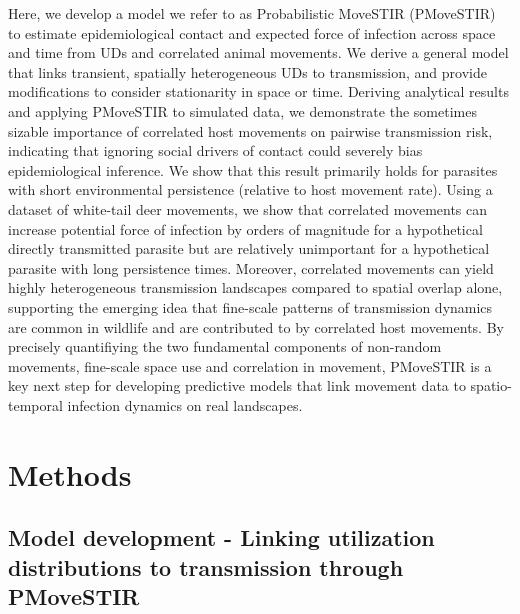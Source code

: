 \documentclass[letterpaper]{article}
\begin{document}
Here, we develop a model we refer to as Probabilistic MoveSTIR (PMoveSTIR) to estimate epidemiological contact and expected force of infection across space and time from UDs and correlated animal movements. We derive a general model that links transient, spatially heterogeneous UDs to transmission, and provide modifications to consider stationarity in space or time.
Deriving analytical results and applying PMoveSTIR to simulated data, we demonstrate the sometimes sizable importance of correlated host movements on pairwise transmission risk, indicating that ignoring social drivers of contact could severely bias epidemiological inference. We show that this result primarily holds for parasites with short environmental persistence (relative to host movement rate). %
Using a dataset of white-tail deer movements, we show that correlated movements can increase potential force of infection by orders of magnitude for a hypothetical directly transmitted parasite but are relatively unimportant for a hypothetical parasite with long persistence times. Moreover, correlated movements can yield highly heterogeneous transmission landscapes compared to spatial overlap alone, supporting the emerging idea that fine-scale patterns of transmission dynamics are common in wildlife \citep{Albery2021} and are contributed to by correlated host movements. By precisely quantifiying the two fundamental components of non-random movements, fine-scale space use and correlation in movement, PMoveSTIR is a key next step for developing predictive models that link movement data to spatio-temporal infection dynamics on real landscapes.


\section*{Methods}

\subsection*{Model development - Linking utilization distributions to transmission through PMoveSTIR}
\end{document}

